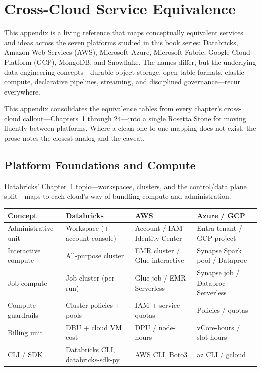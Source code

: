 \chapter{Cross-Cloud Service Equivalence}
%
This appendix is a living reference that maps conceptually equivalent services and
ideas across the seven platforms studied in this book series: Databricks, Amazon Web
Services (AWS), Microsoft Azure, Microsoft Fabric, Google Cloud Platform (GCP),
MongoDB, and Snowflake. The names differ, but the underlying data-engineering
concepts---durable object storage, open table formats, elastic compute, declarative
pipelines, streaming, and disciplined governance---recur everywhere.

\begin{notebox}
This appendix consolidates the equivalence tables from every chapter's cross-cloud
callout---Chapters~1 through 24---into a single Rosetta Stone for moving fluently
between platforms. Where a clean one-to-one mapping does not exist, the prose notes the
closest analog and the caveat.
\end{notebox}

\section{Platform Foundations and Compute}
%
Databricks' Chapter~1 topic---workspaces, clusters, and the control/data plane
split---maps to each cloud's way of bundling compute and administration.

\begin{center}
\footnotesize
\begin{tabular}{@{}p{3.0cm}p{3.4cm}p{3.2cm}p{3.2cm}@{}}
\toprule
\textbf{Concept} & \textbf{Databricks} & \textbf{AWS} & \textbf{Azure / GCP} \\
\midrule
Administrative unit & Workspace (+ account console) & Account / IAM Identity Center & Entra tenant / GCP project \\
Interactive compute & All-purpose cluster & EMR cluster / Glue interactive & Synapse Spark pool / Dataproc \\
Job compute & Job cluster (per run) & Glue job / EMR Serverless & Synapse job / Dataproc Serverless \\
Compute guardrails & Cluster policies + pools & IAM + service quotas & Policies / quotas \\
Billing unit & DBU + cloud VM cost & DPU / node-hours & vCore-hours / slot-hours \\
CLI / SDK & Databricks CLI, databricks-sdk-py & AWS CLI, Boto3 & az CLI / gcloud \\
\bottomrule
\end{tabular}
\end{center}

